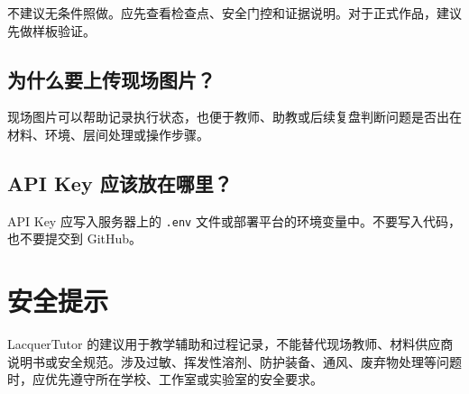 \documentclass[UTF8,a4paper,12pt]{ctexart}
\begin{document}
不建议无条件照做。应先查看检查点、安全门控和证据说明。对于正式作品，建议先做样板验证。

\subsection{为什么要上传现场图片？}

现场图片可以帮助记录执行状态，也便于教师、助教或后续复盘判断问题是否出在材料、环境、层间处理或操作步骤。

\subsection{API Key 应该放在哪里？}

API Key 应写入服务器上的 \texttt{.env} 文件或部署平台的环境变量中。不要写入代码，也不要提交到 GitHub。

\section{安全提示}

LacquerTutor 的建议用于教学辅助和过程记录，不能替代现场教师、材料供应商说明书或安全规范。涉及过敏、挥发性溶剂、防护装备、通风、废弃物处理等问题时，应优先遵守所在学校、工作室或实验室的安全要求。
\end{document}
